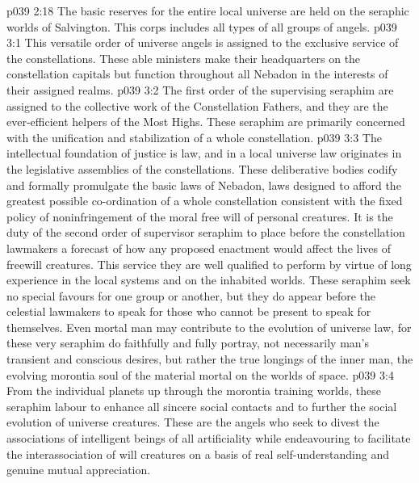 \vs p039 2:18 \pc The basic reserves for the entire local universe are held on the seraphic worlds of Salvington. This corps includes all types of all groups of angels.
\vs p039 3:1 This versatile order of universe angels is assigned to the exclusive service of the constellations. These able ministers make their headquarters on the constellation capitals but function throughout all Nebadon in the interests of their assigned realms.
\vs p039 3:2 \bibnobreakspace {} The first order of the supervising seraphim are assigned to the collective work of the Constellation Fathers, and they are the ever\hyp{}efficient helpers of the Most Highs. These seraphim are primarily concerned with the unification and stabilization of a whole constellation.
\vs p039 3:3 \bibnobreakspace {} The intellectual foundation of justice is law, and in a local universe law originates in the legislative assemblies of the constellations. These deliberative bodies codify and formally promulgate the basic laws of Nebadon, laws designed to afford the greatest possible co\hyp{}ordination of a whole constellation consistent with the fixed policy of noninfringement of the moral free will of personal creatures. It is the duty of the second order of supervisor seraphim to place before the constellation lawmakers a forecast of how any proposed enactment would affect the lives of freewill creatures. This service they are well qualified to perform by virtue of long experience in the local systems and on the inhabited worlds. These seraphim seek no special favours for one group or another, but they do appear before the celestial lawmakers to speak for those who cannot be present to speak for themselves. Even mortal man may contribute to the evolution of universe law, for these very seraphim do faithfully and fully portray, not necessarily man’s transient and conscious desires, but rather the true longings of the inner man, the evolving morontia soul of the material mortal on the worlds of space.
\vs p039 3:4 \bibnobreakspace {} From the individual planets up through the morontia training worlds, these seraphim labour to enhance all sincere social contacts and to further the social evolution of universe creatures. These are the angels who seek to divest the associations of intelligent beings of all artificiality while endeavouring to facilitate the interassociation of will creatures on a basis of real self\hyp{}understanding and genuine mutual appreciation.
